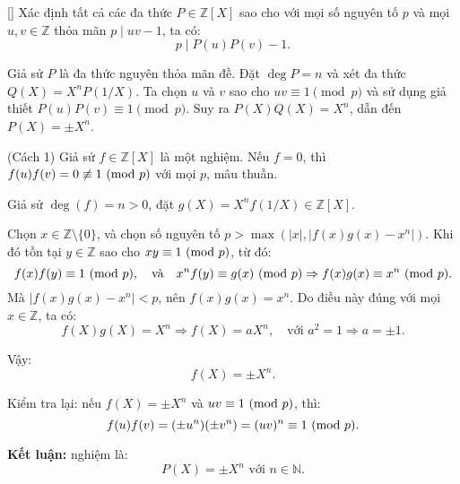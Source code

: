 \documentclass[../07-integer-polynomials.tex]{subfiles}
\begin{document}
\begin{example*}\label{example:FRA-2015-TST2-P2}[\textbf{}]
	Xác định tất cả các đa thức \( P \in \mathbb{Z}[X] \) sao cho với mọi số nguyên tố \( p \) và mọi \( u, v \in \mathbb{Z} \) thỏa mãn \( p \mid uv - 1 \), ta có:
	\[
		p \mid P(u)P(v) - 1.
	\]
\end{example*}

\begin{story*}
	Giả sử \( P \) là đa thức nguyên thỏa mãn đề. Đặt \( \deg P = n \) và xét đa thức \( Q(X) = X^n P(1/X) \).  
	Ta chọn \( u \) và \( v \) sao cho \( uv \equiv 1 \pmod{p} \) và sử dụng giả thiết \( P(u)P(v) \equiv 1 \pmod{p} \).  
	Suy ra \( P(X)Q(X) = X^n \), dẫn đến \( P(X) = \pm X^n \).
\end{story*}

\bigbreak

\begin{soln}(Cách 1)\footnotemark
	Giả sử \( f \in \mathbb{Z}[X] \) là một nghiệm. Nếu \( f = 0 \), thì \( f(u)f(v) = 0 \not\equiv 1 \ (\mathrm{mod}\ p) \) với mọi \( p \), mâu thuẫn.

	Giả sử \( \deg(f) = n > 0 \), đặt \( g(X) = X^n f(1/X) \in \mathbb{Z}[X] \).

	Chọn \( x \in \mathbb{Z} \setminus \{0\} \), và chọn số nguyên tố \( p > \max(|x|, |f(x)g(x) - x^n|) \). Khi đó tồn tại \( y \in \mathbb{Z} \) sao cho \( xy \equiv 1 \ (\mathrm{mod}\ p) \), từ đó:
	\[
		f(x) f(y) \equiv 1 \ (\mathrm{mod}\ p),\quad \text{và}\quad x^n f(y) \equiv g(x) \ (\mathrm{mod}\ p) \Rightarrow f(x) g(x) \equiv x^n \ (\mathrm{mod}\ p).
	\]
	Mà \( |f(x)g(x) - x^n| < p \), nên \( f(x)g(x) = x^n \). Do điều này đúng với mọi \( x \in \mathbb{Z} \), ta có:
	\[
		f(X)g(X) = X^n \Rightarrow f(X) = aX^n,\quad \text{với } a^2 = 1 \Rightarrow a = \pm 1.
	\]

	Vậy:
	\[
		f(X) = \pm X^n.
	\]

	Kiểm tra lại: nếu \( f(X) = \pm X^n \) và \( uv \equiv 1 \ (\mathrm{mod}\ p) \), thì:
	\[
		f(u)f(v) = (\pm u^n)(\pm v^n) = (uv)^n \equiv 1 \ (\mathrm{mod}\ p).
	\]

	\textbf{Kết luận:} nghiệm là:
	\[
		\boxed{P(X) = \pm X^n \text{ với } n \in \mathbb{N}.}
	\]
\end{soln}

\end{document}

